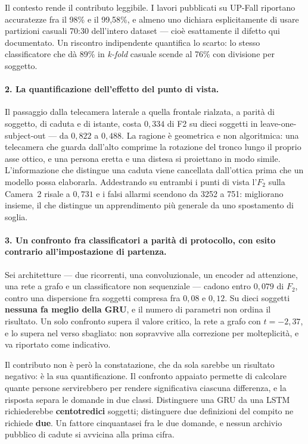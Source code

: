 Il contesto rende il contributo leggibile. I lavori pubblicati su UP-Fall riportano accuratezze fra il 98\% e il 99,58\%, e almeno uno dichiara esplicitamente di usare partizioni casuali 70:30 dell'intero dataset --- cioè esattamente il difetto qui documentato. Un riscontro indipendente quantifica lo scarto: lo stesso classificatore che dà 89\% in \emph{k-fold} casuale scende al 76\% con divisione per soggetto.

\paragraph{2. La quantificazione dell'effetto del punto di vista.} Il passaggio dalla telecamera laterale a quella frontale rialzata, a parità di soggetto, di caduta e di istante, costa $0{,}334$ di F2 su dieci soggetti in leave-one-subject-out --- da $0{,}822$ a $0{,}488$. La ragione è geometrica e non algoritmica: una telecamera che guarda dall'alto comprime la rotazione del tronco lungo il proprio asse ottico, e una persona eretta e una distesa si proiettano in modo simile. L'informazione che distingue una caduta viene cancellata dall'ottica prima che un modello possa elaborarla. Addestrando su entrambi i punti di vista l'$F_2$ sulla Camera~2 risale a $0{,}731$ e i falsi allarmi scendono da 3252 a 751: migliorano insieme, il che distingue un apprendimento più generale da uno spostamento di soglia.

\paragraph{3. Un confronto fra classificatori a parità di protocollo, con esito contrario all'impostazione di partenza.} Sei architetture --- due ricorrenti, una convoluzionale, un encoder ad attenzione, una rete a grafo e un classificatore non sequenziale --- cadono entro $0{,}079$ di $F_2$, contro una dispersione fra soggetti compresa fra $0{,}08$ e $0{,}12$. Su dieci soggetti \textbf{nessuna fa meglio della GRU}, e il numero di parametri non ordina il risultato. Un solo confronto supera il valore critico, la rete a grafo con $t = -2{,}37$, e lo supera nel verso sbagliato: non sopravvive alla correzione per molteplicità, e va riportato come indicativo.

Il contributo non è però la constatazione, che da sola sarebbe un risultato negativo: è la sua quantificazione. Il confronto appaiato permette di calcolare quante persone servirebbero per rendere significativa ciascuna differenza, e la risposta separa le domande in due classi. Distinguere una GRU da una LSTM richiederebbe \textbf{centotredici} soggetti; distinguere due definizioni del compito ne richiede \textbf{due}. Un fattore cinquantasei fra le due domande, e nessun archivio pubblico di cadute si avvicina alla prima cifra.

